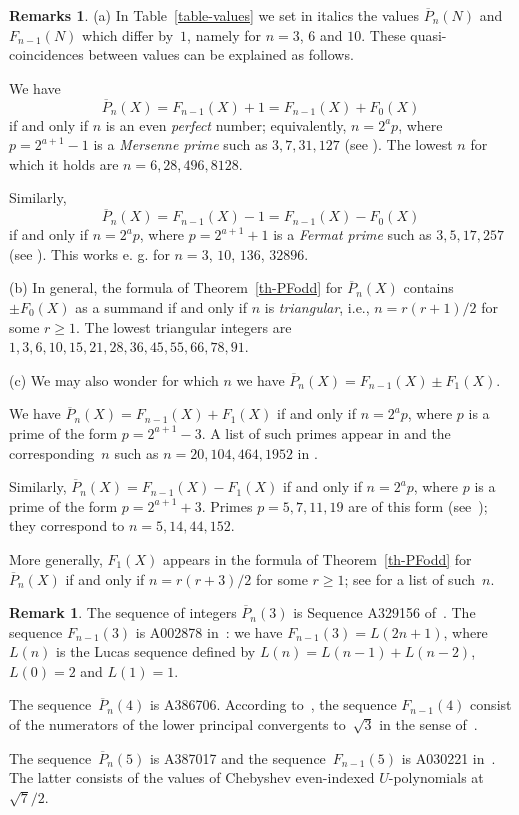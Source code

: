 \documentclass[11pt, a4paper]{amsart}
\theoremstyle{definition}
\newtheorem{rem}[theorem]{Remark}
\newtheorem{rems}[theorem]{Remarks}
\newcommand\Pg{\overline{P}}
\numberwithin{equation}{section}
\begin{document}
\begin{rems}
(a) In Table~\ref{table-values} we set in italics the values $\Pg_n(N)$ and $F_{n-1}(N)$ which differ by~$1$, namely for $n = 3$, $6$
and $10$. These quasi-coincidences between values can be explained as follows.

We have
\[
\Pg_n(X) = F_{n-1}(X) + 1 = F_{n-1}(X) + F_0(X) 
\]
if and only if $n$ is an even \emph{perfect} number; equivalently,
$n = 2^a p$, where $p = 2^{a+1} - 1$ is a \emph{Mersenne prime} such as $3, 7, 31, 127$
(see \cite[A000668]{OEIS}). The lowest $n$ for which it holds are $n = 6, 28, 496, 8128$.

Similarly, 
\[
\Pg_n(X) = F_{n-1}(X)  - 1 = F_{n-1}(X) - F_0(X) 
\]
if and only if $n = 2^a p$, where $p = 2^{a+1} + 1$ is a \emph{Fermat prime} such as $3, 5, 17, 257$
(see \cite[A000215]{OEIS}). This works e. g. for $n = 3$, $10$, $136$, $32896$.

(b) In general, the formula of Theorem~\ref{th-PFodd} for $\Pg_n(X)$ contains $\pm F_0(X)$ as a summand if and only if 
$n$ is \emph{triangular}, i.e., $n = r(r+1)/2$ for some $r\geq 1$.
The lowest triangular integers are $1, 3, 6, 10, 15, 21, 28, 36, 45, 55, 66, 78, 91$.

(c) We may also wonder for which $n$ we have 
$\Pg_n(X) = F_{n-1}(X) \pm F_1(X)$.

We have $\Pg_n(X) = F_{n-1}(X) + F_1(X)$ if and only if $n = 2^a p$, where $p$ is a prime of the form $p = 2^{a+1} - 3$.
A list of such primes appear in \cite[A050415]{OEIS} and the corresponding~$n$ such as $n= 20, 104, 464, 1952$
in \cite[A181703]{OEIS}.

Similarly, $\Pg_n(X) = F_{n-1}(X) - F_1(X)$ if and only if $n = 2^a p$, where $p$ is a prime of the form $p = 2^{a+1} + 3$.
Primes $p = 5, 7, 11, 19$ are of this form (see~\cite[A057733]{OEIS}); they correspond to $n= 5, 14, 44, 152$.

More generally, $F_1(X)$ appears in the formula of Theorem~\ref{th-PFodd} for $\Pg_n(X)$ if and only if
$n = r(r+3)/2$ for some $r\geq 1$; see \cite[A000096]{OEIS} for a list of such~$n$.
\end{rems}

\begin{rem}
The sequence of integers $\Pg_n(3)$ is Sequence A329156 of~\cite{OEIS}.
The sequence $F_{n-1}(3)$ is A002878 in~\cite{OEIS}:
we have $F_{n-1}(3) = L(2n+1)$, where $L(n)$ is the Lucas sequence defined by $L(n) = L(n-1) + L(n-2)$, 
$L(0) = 2$ and $L(1) = 1$.

The sequence~$\Pg_n(4)$ is A386706.
According to~\cite[A001834]{OEIS}, the sequence $F_{n-1}(4)$ consist of the numerators of 
the lower principal convergents to~$\sqrt{3}$ in the sense of~\cite{Ki}.

The sequence~$\Pg_n(5)$ is A387017 and the sequence~$F_{n-1}(5)$ is A030221 in~\cite{OEIS}.
The latter consists of the values of Chebyshev even-indexed $U$-polynomials at~$\sqrt{7}/2$. 
\end{rem}
\end{document}
